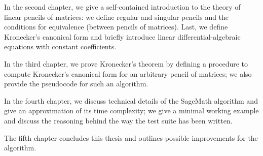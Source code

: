 In the second chapter, we give a self-contained introduction to the theory of linear pencils of matrices: we
define regular and singular pencils and the conditions for equivalence (between pencils of matrices). Last, we
define Kronecker's canonical form and briefly introduce linear differential-algebraic equations with constant
coefficients.

In the third chapter, we prove Kronecker's theorem by defining a procedure to compute Kronecker's canonical form
for an arbitrary pencil of matrices; we also provide the pseudocode for such an algorithm.

In the fourth chapter, we discuss technical details of the SageMath algorithm and
give an approximation of its time complexity; we give a minimal working example and discuss the reasoning behind the way
the test suite has been written.

The fifth chapter concludes this thesis and outlines possible improvements for the algorithm.